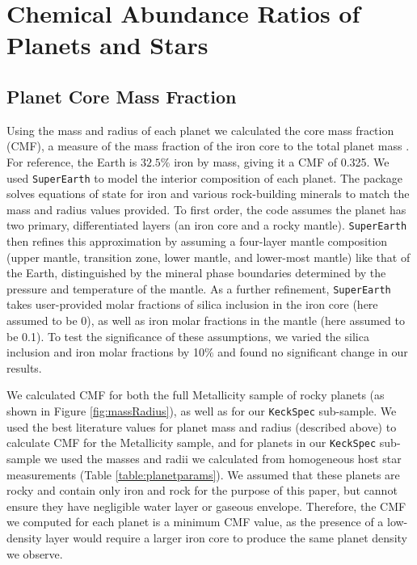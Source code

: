 \documentclass[twocolumn]{aastex631}
\begin{document}
\section{Chemical Abundance Ratios of Planets and Stars}
\subsection{Planet Core Mass Fraction}
\label{sec:CMF}
Using the mass and radius of each planet we calculated the core mass fraction (CMF), a measure of the mass fraction of the iron core to the total planet mass \citep[e.g.][]{2007ApJ...669.1279S, 2014ApJ...787..173H, 2016ApJ...819..127Z}. For reference, the Earth is $32.5\%$ iron by mass, giving it a CMF of 0.325. We used \texttt{SuperEarth} \citep{2006Icar..181..545V, Plotnykov2020} to model the interior composition of each planet. The package solves equations of state for iron and various rock-building minerals to match the mass and radius values provided. To first order, the code assumes the planet has two primary, differentiated layers (an iron core and a rocky mantle). \texttt{SuperEarth} then refines this approximation by assuming a four-layer mantle composition (upper mantle, transition zone, lower mantle, and lower-most mantle) like that of the Earth, distinguished by the mineral phase boundaries determined by the pressure and temperature of the mantle. As a further refinement, {\tt SuperEarth} takes user-provided molar fractions of silica inclusion in the iron core (here assumed to be 0), as well as iron molar fractions in the mantle (here assumed to be 0.1). To test the significance of these assumptions, we varied the silica inclusion and iron molar fractions by 10$\%$ and found no significant change in our results. 


We calculated CMF for both the full Metallicity sample of rocky planets (as shown in Figure \ref{fig:massRadius}), as well as for our \texttt{KeckSpec} sub-sample. We used the best literature values for planet mass and radius (described above) to calculate CMF for the Metallicity sample, and for planets in our \texttt{KeckSpec} sub-sample we used the masses and radii we calculated from homogeneous host star measurements (Table \ref{table:planetparams}). We assumed that these planets are rocky and contain only iron and rock for the purpose of this paper, but cannot ensure they have negligible water layer or gaseous envelope. Therefore, the CMF we computed for each planet is a minimum CMF value, as the presence of a low-density layer would require a larger iron core to produce the same planet density we observe. 
\end{document}
